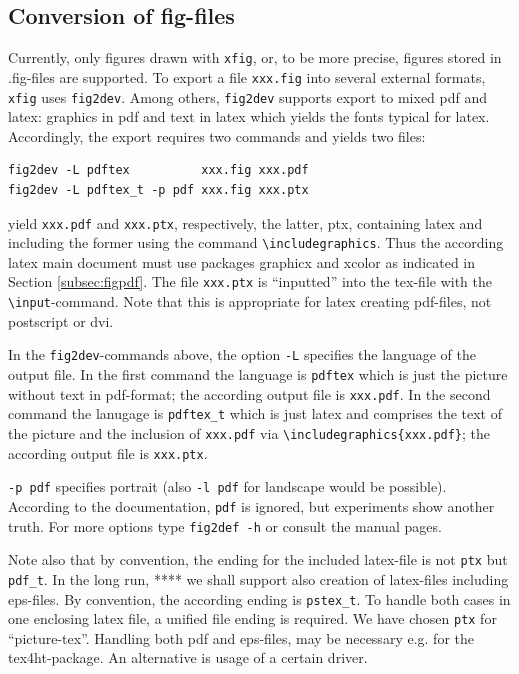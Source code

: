 \documentclass[12pt]{article}
\begin{document}
\subsection{Conversion of fig-files}\label{subsec:fig2dev}

Currently, only figures drawn with {\tt xfig}, or, to be more precise, 
figures stored in .fig-files are supported. 
To export a file {\tt xxx.fig} into several external formats, 
{\tt xfig} uses {\tt fig2dev}. 
Among others, {\tt fig2dev} supports export to mixed pdf and latex: 
graphics in pdf and text in latex which yields the fonts typical for latex. 
Accordingly, the export requires two commands and yields two files: 
%
\begin{verbatim}
fig2dev -L pdftex          xxx.fig xxx.pdf   
fig2dev -L pdftex_t -p pdf xxx.fig xxx.ptx
\end{verbatim}
%
yield {\tt xxx.pdf} and {\tt xxx.ptx}, respectively, 
the latter, \gls{ptx}, containing latex and including the former 
using the command {\tt\textbackslash includegraphics}. 
Thus the according latex main document must use packages graphicx and xcolor 
as indicated in Section \ref{subsec:figpdf}. 
The file {\tt xxx.ptx} is ``inputted'' into the tex-file 
with the {\tt\textbackslash input}-command. 
Note that this is appropriate for latex creating pdf-files, 
not postscript or dvi. 

In the {\tt fig2dev}-commands above, 
the option {\tt -L} specifies the language of the output file. 
In the first command the language is {\tt pdftex} 
which is just the picture without text in pdf-format; 
the according output file is  {\tt xxx.pdf}. 
In the second command the lanugage is {\tt pdftex\_t} 
which is just latex and 
comprises the text of the picture and the inclusion of {\tt xxx.pdf}
via {\tt\textbackslash includegraphics\{xxx.pdf\}}; 
the according output file is {\tt xxx.ptx}. 

{\tt -p pdf} specifies portrait 
(also {\tt -l pdf} for landscape would be possible). 
According to the documentation, {\tt pdf} is ignored, 
but experiments show another truth. 
For more options type {\tt fig2def -h} or consult the manual pages. 


Note also that by convention, the ending for the included latex-file 
is not {\tt ptx} but {\tt pdf\_t}. 
In the long run, **** we shall support also creation of latex-files 
including \gls{eps}-files. 
By convention, the according ending is {\tt pstex\_t}. 
To handle both cases in one enclosing latex file, 
a unified file ending is required. 
We have chosen {\tt ptx} for ``picture-tex''. 
Handling both \gls{pdf} and \gls{eps}-files, 
may be necessary e.g. for the tex4ht-package. 
An alternative is usage of a certain driver. 
\end{document}
